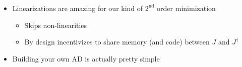 \documentclass[aspectratio=169,xcolor=dvipsnames]{beamer}
\begin{document}
\begin{frame}
	\frametitle{\insertsection}
	\framesubtitle{\insertsubsection}

	\begin{itemize}
		\item Linearizations are amazing for our kind of $2^\text{nd}$ order minimization
		\begin{itemize}
			\item Skips non-linearities
			\item By design incentivizes to share memory (and code) between $J$ and $J^\dagger$
		\end{itemize}
		\item Building your own AD is actually pretty simple
	\end{itemize}

\end{frame}
\end{document}

